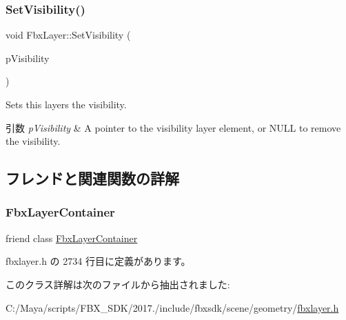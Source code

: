 \subsubsection{\texorpdfstring{Set\+Visibility()}{SetVisibility()}}
{\footnotesize\ttfamily void Fbx\+Layer\+::\+Set\+Visibility (\begin{DoxyParamCaption}\item[{\hyperlink{class_fbx_layer_element_visibility}{Fbx\+Layer\+Element\+Visibility} $\ast$}]{p\+Visibility }\end{DoxyParamCaption})}

Sets this layer\textquotesingle{}s the visibility. 
\begin{DoxyParams}{引数}
{\em p\+Visibility} & A pointer to the visibility layer element, or {\ttfamily N\+U\+LL} to remove the visibility. \\
\hline
\end{DoxyParams}


\subsection{フレンドと関連関数の詳解}
\mbox{\label{class_fbx_layer_a791d2046ce60bf6f5fb85d9dc6242f2e}} 
\subsubsection{\texorpdfstring{Fbx\+Layer\+Container}{FbxLayerContainer}}
{\footnotesize\ttfamily friend class \hyperlink{class_fbx_layer_container}{Fbx\+Layer\+Container}\hspace{0.3cm}{\ttfamily [friend]}}



 fbxlayer.\+h の 2734 行目に定義があります。



このクラス詳解は次のファイルから抽出されました\+:\begin{DoxyCompactItemize}
\item 
C\+:/\+Maya/scripts/\+F\+B\+X\+\_\+\+S\+D\+K/2017./include/fbxsdk/scene/geometry/\hyperlink{fbxlayer_8h}{fbxlayer.\+h}\end{DoxyCompactItemize}
